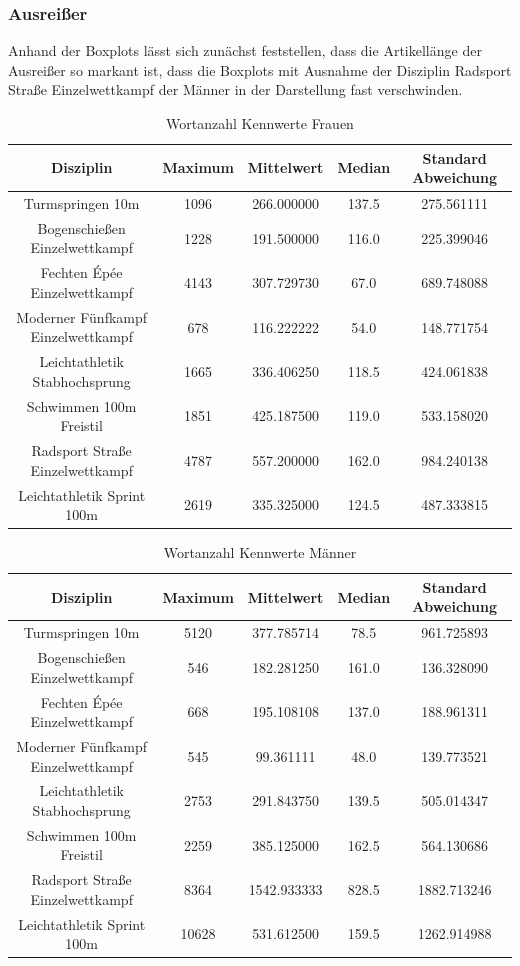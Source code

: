\documentclass[11pt]{article}
\begin{document}
\subsubsection{Ausreißer}

Anhand der Boxplots lässt sich zunächst feststellen, dass die Artikellänge der Ausreißer so markant ist, dass die Boxplots mit Ausnahme der Disziplin Radsport Straße Einzelwettkampf der Männer in der Darstellung fast verschwinden.


\begin{table}
\begin{tabular}{ c|c|c|c|c }
  Disziplin & Maximum & Mittelwert & Median & Standard Abweichung \\
  \hline
  Turmspringen 10m & 1096 & 266.000000 & 137.5 & 275.561111\\
  Bogenschießen Einzelwettkampf & 1228 & 191.500000 & 116.0 & 225.399046\\
  Fechten Épée Einzelwettkampf & 4143& 307.729730 & 67.0 & 689.748088\\
  Moderner Fünfkampf Einzelwettkampf & 678& 116.222222 & 54.0& 148.771754\\
  Leichtathletik Stabhochsprung & 1665 & 336.406250 & 118.5 & 424.061838\\
  Schwimmen 100m Freistil & 1851 & 425.187500 & 119.0 & 533.158020\\
  Radsport Straße Einzelwettkampf & 4787& 557.200000 & 162.0 & 984.240138\\
  Leichtathletik Sprint 100m & 2619& 335.325000 & 124.5& 487.333815\\
\end{tabular}
\caption{\label{tab:wordcount_kpi_women}Wortanzahl Kennwerte Frauen}
\end{table}

\begin{table}
\begin{tabular}{ c|c|c|c|c }
  Disziplin & Maximum & Mittelwert & Median & Standard Abweichung \\
  \hline
  Turmspringen 10m & 5120 & 377.785714 & 78.5 & 961.725893\\
  Bogenschießen Einzelwettkampf & 546 & 182.281250 & 161.0 & 136.328090\\
  Fechten Épée Einzelwettkampf & 668 & 195.108108 & 137.0 & 188.961311\\
  Moderner Fünfkampf Einzelwettkampf & 545 & 99.361111 & 48.0 & 139.773521\\
  Leichtathletik Stabhochsprung & 2753 & 291.843750 & 139.5 & 505.014347\\
  Schwimmen 100m Freistil & 2259 & 385.125000 & 162.5 & 564.130686\\
  Radsport Straße Einzelwettkampf & 8364 & 1542.933333 & 828.5 & 1882.713246\\
  Leichtathletik Sprint 100m & 10628 & 531.612500 & 159.5 & 1262.914988\\
\end{tabular}
\caption{\label{tab:wordcount_kpi_men}Wortanzahl Kennwerte Männer}
\end{table}
\end{document}
